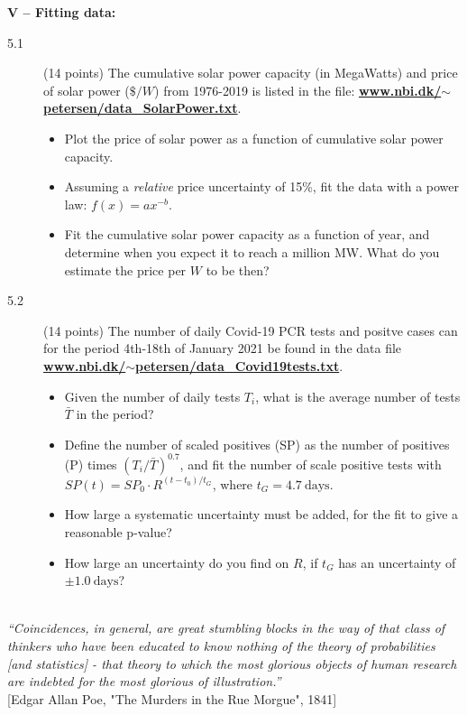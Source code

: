 \documentclass[11pt]{article}
\begin{document}
\noindent
{\bf V -- Fitting data:}
\begin{description}
\item[5.1] (14 points) 
  The cumulative solar power capacity (in MegaWatts) and price of solar power ($\$/W$) from 1976-2019 is listed in the file:
  \href{http://www.nbi.dk/~petersen/data\_SolarPower.txt}{\bf www.nbi.dk/$\sim$petersen/data\_SolarPower.txt}.
  \vspace*{-1ex}
  \begin{itemize}
    \item Plot the price of solar power as a function of cumulative solar power capacity.
    \item Assuming a \emph{relative} price uncertainty of 15\%, fit the data with a power law: $f(x) = a x^{-b}$.
    \item Fit the cumulative solar power capacity as a function of year, and determine when you expect it to reach a million MW.
      What do you estimate the price per $W$ to be then?
  \end{itemize}
%
\item[5.2] (14 points)
  The number of daily Covid-19 PCR tests and positve cases can for the period 4th-18th of January 2021 be found in the data file
  \href{http://www.nbi.dk/~petersen/data\_Covid19tests.txt}{\bf www.nbi.dk/$\sim$petersen/data\_Covid19tests.txt}.
  \vspace{-1.0ex}
  \begin{itemize}
    \item Given the number of daily tests $T_i$, what is the average number of tests $\bar{T}$ in the period?
    \item Define the number of scaled positives (SP) as the number of positives (P) times $(T_i/\bar{T})^{0.7}$,
      and fit the number of scale positive tests with $SP(t) = SP_0 \cdot R^{(t - t_0)/t_G}$, where $t_G = 4.7~\mbox{days}$.
    \item How large a systematic uncertainty must be added, for the fit to give a reasonable p-value?
    \item How large an uncertainty do you find on $R$, if $t_G$ has an uncertainty of $\pm 1.0~\mbox{days}$?
  \end{itemize}
\vspace*{-2ex}
\end{description}



\noindent
\hrulefill\\
\emph{``Coincidences, in general, are great stumbling blocks in the way of that class of thinkers who have been educated to know nothing of the theory of probabilities [and statistics] - that theory to which the most glorious objects of human research are indebted for the most glorious of illustration.''}\\
  \phantom{} \hfill [Edgar Allan Poe, "The Murders in the Rue Morgue", 1841]\\[-2ex]
\end{document}
